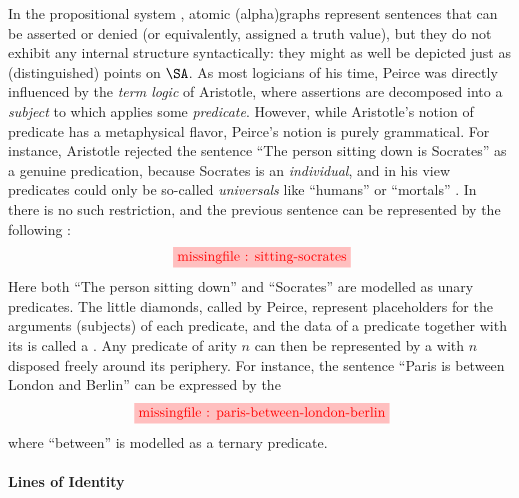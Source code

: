\begin{scope}
\begin{scope}
In the propositional system , atomic \kl(alpha){graphs} represent
sentences that can be asserted or denied (or equivalently, assigned a truth
value), but they do not exhibit any internal structure syntactically: they might
as well be depicted just as (distinguished) points on $\SA$. As most logicians
of his time, Peirce was directly influenced by the \emph{term logic} of
Aristotle, where assertions are decomposed into a \emph{subject} to which
applies some \emph{predicate}. However, while Aristotle's notion of predicate
has a metaphysical flavor, Peirce's notion is purely grammatical. For instance,
Aristotle rejected the sentence ``The person sitting down is Socrates'' as a
genuine predication, because Socrates is an \emph{individual}, and in his view
predicates could only be so-called \emph{universals} like ``humans'' or
``mortals'' . In  there is no such
restriction, and the previous sentence can be represented by the following
:
\begin{equation}
  \tikzfig{1}{0.5}{sitting-socrates} \label{eq:sitting-socrates}
\end{equation}
\AP
Here both ``The person sitting down'' and ``Socrates'' are modelled as unary
predicates. The little diamonds, called  by Peirce, represent
placeholders for the arguments (subjects) of each predicate, and the data of a
predicate together with its  is called a . Any predicate of arity $n$ can then be represented by a
 with $n$  disposed freely around its periphery. For
instance, the sentence ``Paris is between London and Berlin'' can be expressed
by the 
\begin{equation*}
  \tikzfig{1}{0.5}{paris-between-london-berlin} \label{eq:paris-between-london-berlin}
\end{equation*}
where ``between'' is modelled as a ternary predicate.

\paragraph{Lines of Identity}


\end{scope}
\end{scope}

